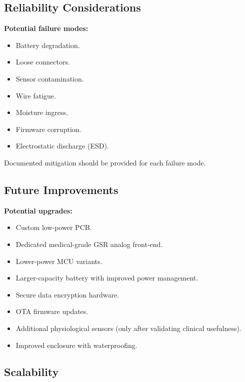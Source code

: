\subsection{Reliability Considerations}
\label{sec:reliability-considerations}

\begin{observationbox}
\textbf{Potential failure modes:}
\begin{itemize}
    \item Battery degradation.
    \item Loose connectors.
    \item Sensor contamination.
    \item Wire fatigue.
    \item Moisture ingress.
    \item Firmware corruption.
    \item Electrostatic discharge (ESD).
\end{itemize}
Documented mitigation should be provided for each failure mode.
\end{observationbox}

\subsection{Future Improvements}
\label{sec:future-improvements-ch9}

\begin{futureworkbox}
\textbf{Potential upgrades:}
\begin{itemize}
    \item Custom low-power PCB.
    \item Dedicated medical-grade GSR analog front-end.
    \item Lower-power MCU variants.
    \item Larger-capacity battery with improved power management.
    \item Secure data encryption hardware.
    \item OTA firmware updates.
    \item Additional physiological sensors (only after validating clinical usefulness).
    \item Improved enclosure with waterproofing.
\end{itemize}
\end{futureworkbox}

\subsection{Scalability}
\label{sec:scalability-ch9}

